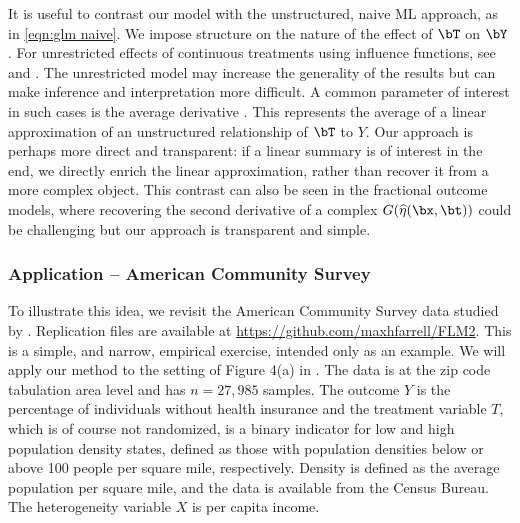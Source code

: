 \documentclass[12pt]{article}
\numberwithin{equation}{section}
\theoremstyle{definition}
\begin{document}
\begin{appendices}
It is useful to contrast our model with the unstructured, naive ML approach, as in \eqref{eqn:glm naive}. We impose structure on the nature of the effect of $\bT$ on $\bY$. For unrestricted effects of continuous treatments using influence functions, see \cite{Kennedy-Ma-McHugh-Small2017_JRSSB} and \cite{Colangelo-Lee2023_WP}. The unrestricted model may increase the generality of the results but can make inference and interpretation more difficult. A common parameter of interest in such cases is the average derivative \citep{Powell-Stock-Stoker1989_Ecma,Newey-Stoker1993_Ecma}. This represents the average of a linear approximation of an unstructured relationship of $\bT$ to $Y$. Our approach is perhaps more direct and transparent: if a linear summary is of interest in the end, we directly enrich the linear approximation, rather than recover it from a more complex object. This contrast can also be seen in the fractional outcome models, where recovering the second derivative of a complex $G(\widehat\eta(\bx,\bt))$ could be challenging but our approach is transparent and simple.





\subsubsection{Application -- American Community Survey}

To illustrate this idea, we revisit the American Community Survey data studied by \cite{Cattaneo-Crump-Farrell-Feng2024_WP}. Replication files are available at \url{https://github.com/maxhfarrell/FLM2}. This is a simple, and narrow, empirical exercise, intended only as an example. We will apply our method to the setting of Figure 4(a) in \cite{Cattaneo-Crump-Farrell-Feng2024_WP}. The data is at the zip code tabulation area level and has $n=27,985$ samples. The outcome $Y$ is the percentage of individuals without health insurance and the treatment variable $T$, which is of course not randomized, is a binary indicator for low and high population density states, defined as those with population densities below or above 100 people per square mile, respectively. Density is defined as the average population per square mile, and the data is available from the Census Bureau. The heterogeneity variable $X$ is per capita income. 


\end{appendices}
\end{document}
